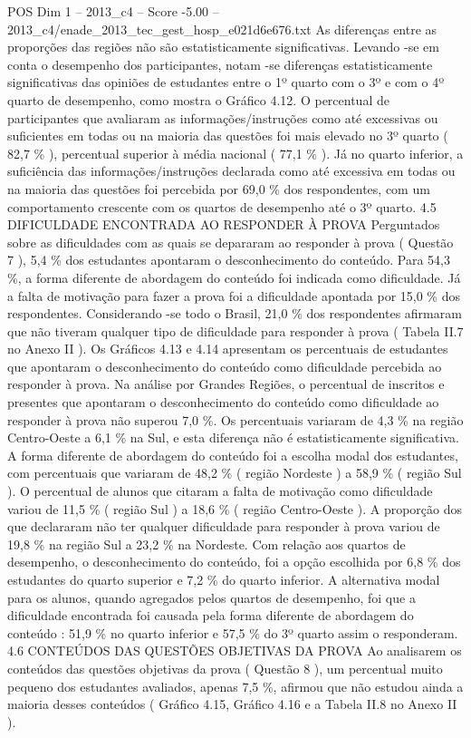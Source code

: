 \begin{textsample}{POS Dim 1 – 2013\_c4 – Score -5.00 – 2013\_c4/enade\_2013\_tec\_gest\_hosp\_e021d6e676.txt}
As diferenças entre as proporções das regiões não são estatisticamente significativas.
Levando -se em conta o desempenho dos participantes, notam -se diferenças estatisticamente significativas das opiniões de estudantes entre o 1º quarto com o 3º e com o 4º quarto de desempenho, como mostra o Gráfico 4.12.
O percentual de participantes que avaliaram as informações/instruções como até excessivas ou suficientes em todas ou na maioria das questões foi mais elevado no 3º quarto ( 82,7 \% ), percentual superior à média nacional ( 77,1 \% ).
Já no quarto inferior, a suficiência das informações/instruções declarada como até excessiva em todas ou na maioria das questões foi percebida por 69,0 \% dos respondentes, com um comportamento crescente com os quartos de desempenho até o 3º quarto. 4.5 DIFICULDADE ENCONTRADA AO RESPONDER À PROVA Perguntados sobre as dificuldades com as quais se depararam ao responder à prova ( Questão 7 ), 5,4 \% dos estudantes apontaram o desconhecimento do conteúdo.
Para 54,3 \%, a forma diferente de abordagem do conteúdo foi indicada como dificuldade.
Já a falta de motivação para fazer a prova foi a dificuldade apontada por 15,0 \% dos respondentes.
Considerando -se todo o Brasil, 21,0 \% dos respondentes afirmaram que não tiveram qualquer tipo de dificuldade para responder à prova ( Tabela II.7 no Anexo II ).
Os Gráficos 4.13 e 4.14 apresentam os percentuais de estudantes que apontaram o desconhecimento do conteúdo como dificuldade percebida ao responder à prova.
Na análise por Grandes Regiões, o percentual de inscritos e presentes que apontaram o desconhecimento do conteúdo como dificuldade ao responder à prova não superou 7,0 \%.
Os percentuais variaram de 4,3 \% na região Centro-Oeste a 6,1 \% na Sul, e esta diferença não é estatisticamente significativa.
A forma diferente de abordagem do conteúdo foi a escolha modal dos estudantes, com percentuais que variaram de 48,2 \% ( região Nordeste ) a 58,9 \% ( região Sul ).
O percentual de alunos que citaram a falta de motivação como dificuldade variou de 11,5 \% ( região Sul ) a 18,6 \% ( região Centro-Oeste ).
A proporção dos que declararam não ter qualquer dificuldade para responder à prova variou de 19,8 \% na região Sul a 23,2 \% na Nordeste.
Com relação aos quartos de desempenho, o desconhecimento do conteúdo, foi a opção escolhida por 6,8 \% dos estudantes do quarto superior e 7,2 \% do quarto inferior.
A alternativa modal para os alunos, quando agregados pelos quartos de desempenho, foi que a dificuldade encontrada foi causada pela forma diferente de abordagem do conteúdo : 51,9 \% no quarto inferior e 57,5 \% do 3º quarto assim o responderam. 4.6 CONTEÚDOS DAS QUESTÕES OBJETIVAS DA PROVA Ao analisarem os conteúdos das questões objetivas da prova ( Questão 8 ), um percentual muito pequeno dos estudantes avaliados, apenas 7,5 \%, afirmou que não estudou ainda a maioria desses conteúdos ( Gráfico 4.15, Gráfico 4.16 e a Tabela II.8 no Anexo II ).

\end{textsample}
